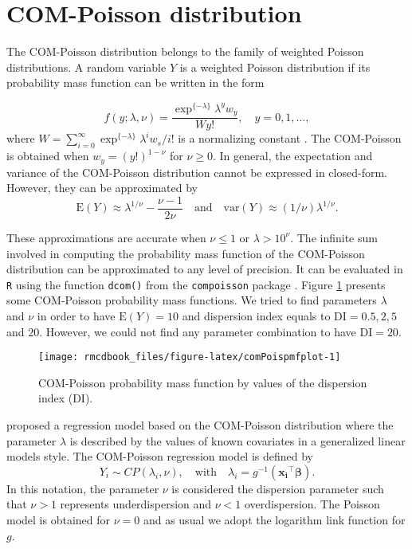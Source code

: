\documentclass[9pt,a5paper,]{book}
\theoremstyle{definition}
\theoremstyle{definition}
\theoremstyle{remark}
\begin{document}
\section{COM-Poisson distribution}\label{com-poisson-distribution}

The COM-Poisson distribution belongs to the family of weighted Poisson
distributions. A random variable \(Y\) is a weighted Poisson
distribution if its probability mass function can be written in the form

\[
f(y; \lambda, \nu) = \frac{\exp^{\{-\lambda\}} \lambda^y w_y}{W y!}, \quad y = 0, 1, \ldots,
\] where
\(W = \sum_{i = 0}^{\infty} \exp^{\{-\lambda\}} \lambda^i w_s / i!\) is
a normalizing constant \citep{Sellers2012}. The COM-Poisson is obtained
when \(w_{y} = (y!)^{1-\nu}\) for \(\nu \geq 0\). In general, the
expectation and variance of the COM-Poisson distribution cannot be
expressed in closed-form. However, they can be approximated by
\[\mathrm{E}(Y) \approx \lambda^{1/\nu} - \frac{\nu - 1}{2 \nu} \quad
\text{and} \quad \mathrm{var}(Y) \approx (1/ \nu) \lambda^{1 /\nu}.\]

These approximations are accurate when \(\nu \leq 1\) or
\(\lambda > 10^{\nu}\). The infinite sum involved in computing the
probability mass function of the COM-Poisson distribution can be
approximated to any level of precision. It can be evaluated in
\texttt{R} using the function \texttt{dcom()} from the
\texttt{compoisson} package \citep{Dunn2012}. Figure
\ref{fig:comPoispmfplot} presents some COM-Poisson probability mass
functions. We tried to find parameters \(\lambda\) and \(\nu\) in order
to have \(\mathrm{E}(Y) = 10\) and dispersion index equals to
\(\mathrm{DI} = 0.5, 2, 5\) and \(20\). However, we could not find any
parameter combination to have \(\mathrm{DI} = 20\).

\begin{figure}[h]

{\centering \texttt{[image: rmcdbook\_files/figure-latex/comPoispmfplot-1]} 

}

\caption{COM-Poisson probability mass function by values of the dispersion index (DI).}\label{fig:comPoispmfplot}
\end{figure}

\citet{Sellers2010} proposed a regression model based on the COM-Poisson
distribution where the parameter \(\lambda\) is described by the values
of known covariates in a generalized linear models style. The
COM-Poisson regression model is defined by
\[Y_i \sim CP(\lambda_i, \nu), \quad  \text{with} \quad \lambda_i = g^{-1}(\boldsymbol{x_i}^{\top} \boldsymbol{\beta}).\]
In this notation, the parameter \(\nu\) is considered the dispersion
parameter such that \(\nu > 1\) represents underdispersion and
\(\nu < 1\) overdispersion. The Poisson model is obtained for
\(\nu = 0\) and as usual we adopt the logarithm link function for \(g\).
\end{document}

